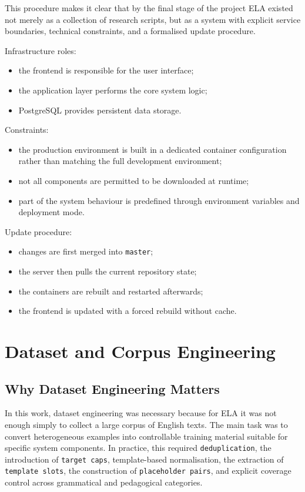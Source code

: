 \documentclass[12pt,a4paper,oneside]{report}
\begin{document}
This procedure makes it clear that by the final stage of the project ELA existed not merely as a collection of research scripts, but as a system with explicit service boundaries, technical constraints, and a formalised update procedure.

Infrastructure roles:
\begin{itemize}
  \item the frontend is responsible for the user interface;
  \item the application layer performs the core system logic;
  \item PostgreSQL provides persistent data storage.
\end{itemize}

Constraints:
\begin{itemize}
  \item the production environment is built in a dedicated container configuration rather than matching the full development environment;
  \item not all components are permitted to be downloaded at runtime;
  \item part of the system behaviour is predefined through environment variables and deployment mode.
\end{itemize}

Update procedure:
\begin{itemize}
  \item changes are first merged into \texttt{master};
  \item the server then pulls the current repository state;
  \item the containers are rebuilt and restarted afterwards;
  \item the frontend is updated with a forced rebuild without cache.
\end{itemize}

\chapter{Dataset and Corpus Engineering}
\section{Why Dataset Engineering Matters}
In this work, dataset engineering was necessary because for ELA it was not enough simply to collect a large corpus of English texts. The main task was to convert heterogeneous examples into controllable training material suitable for specific system components. In practice, this required \texttt{deduplication}, the introduction of \texttt{target caps}, template-based normalisation, the extraction of \texttt{template slots}, the construction of \texttt{placeholder pairs}, and explicit coverage control across grammatical and pedagogical categories.
\end{document}

